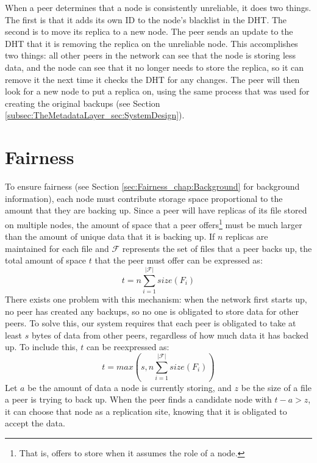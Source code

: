 \documentclass[12pt]{report}
\begin{document}
When a peer determines that a node is consistently unreliable, it does two things. The first is that it adds its own ID to the node's blacklist in the DHT. The second is to move its replica to a new node. The peer sends an update to the DHT that it is removing the replica on the unreliable node. This accomplishes two things: all other peers in the network can see that the node is storing less data, and the node can see that it no longer needs to store the replica, so it can remove it the next time it checks the DHT for any changes. The peer will then look for a new node to put a replica on, using the same process that was used for creating the original backups (see Section \ref{subsec:TheMetadataLayer_sec:SystemDesign}). %

\section{Fairness} \label{sec:Fairness_chap:BTBackup}
To ensure fairness (see Section \ref{sec:Fairness_chap:Background} for background information), each node must contribute storage space proportional to the amount that they are backing up. Since a peer will have replicas of its file stored on multiple nodes, the amount of space that a peer offers\footnote{That is, offers to store when it assumes the role of a node.} must be much larger than the amount of unique data that it is backing up. If $n$ replicas are maintained for each file and $\mathcal{F}$ represents the set of files that a peer backs up, the total amount of space $t$ that the peer must offer can be expressed as:
\begin{equation}
t=n\sum\limits_{i=1}^{|\mathcal{F}|} size(F_i)
\end{equation}
There exists one problem with this mechanism: when the network first starts up, no peer has created any backups, so no one is obligated to store data for other peers. To solve this, our system requires that each peer is obligated to take at least $s$ bytes of data from other peers, regardless of how much data it has backed up. To include this, $t$ can be reexpressed as:
\begin{equation}
t=max(s,n\sum\limits_{i=1}^{|\mathcal{F}|} size(F_i))
\end{equation}
Let $a$ be the amount of data a node is currently storing, and $z$ be the size of a file a peer is trying to back up. When the peer finds a candidate node with $t - a > z$, it can choose that node as a replication site, knowing that it is obligated to accept the data.
\end{document}
